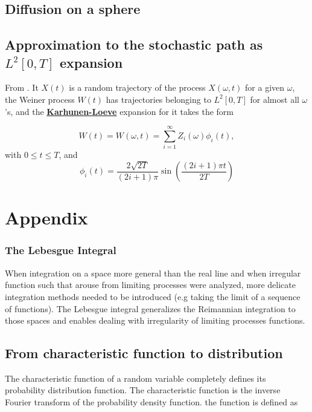 \documentclass[12pt]{book}
\begin{document}
\section{Diffusion on a sphere}

\section{Approximation to the stochastic path as $L^2[0,T]$ expansion}
From \cite{iacus2009simulation}. It $X(t)$ is a random trajectory of the process $X(\omega, t)$ for a given $\omega$, the Weiner process $W(t)$ has trajectories belonging to $L^2[0,T]$ for almost all $\omega$'s, and the \textbf{\href{http://en.wikipedia.org/wiki/Karhunen-Loeve_theorem}{Karhunen-Loeve}} expansion for it takes the form 

\begin{equation*}
W(t)=W(\omega,t)= \sum_{i=1}^\infty Z_i(\omega)\phi_i(t), 
\end{equation*}
with $0\leq t \leq T$, and 
\begin{equation*}
\phi_i(t) = \frac{2\sqrt{2T}}{(2i+1)\pi} \sin \left(\frac{(2i+1)\pi t}{2T} \right)
\end{equation*}

\chapter{Appendix}
\subsection{The Lebesgue Integral}\label{appendix:theLebesgueIntegral}
When integration on a space more general than the real line and when irregular function such that arouse from limiting processes were analyzed, more delicate integration methods needed to be introduced (e.g taking the limit of  a sequence of functions). The Lebesgue integral generalizes the Reimannian integration to those spaces and enables dealing with irregularity of limiting processes functions. 

\section{From characteristic function to distribution}\label{appecndix:fromCharacteristicfunctionToDistribution}
The characteristic function of a random variable completely defines its probability distribution function. 
The characteristic function is the inverse Fourier transform of the probability density function. the function is defined as 
\end{document}
